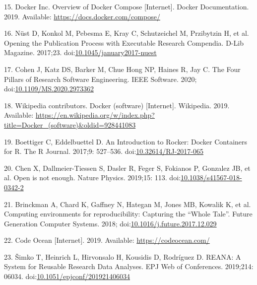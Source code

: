 \documentclass[10pt,letterpaper]{article}
\begin{document}
\leavevmode\hypertarget{ref-docker-compose_2019}{}%
15. Docker Inc. Overview of Docker Compose {[}Internet{]}. Docker
Documentation. 2019. Available: \url{https://docs.docker.com/compose/}

\leavevmode\hypertarget{ref-nust_opening_2017}{}%
16. Nüst D, Konkol M, Pebesma E, Kray C, Schutzeichel M, Przibytzin H,
et al. Opening the Publication Process with Executable Research
Compendia. D-Lib Magazine. 2017;23.
doi:\href{https://doi.org/10.1045/january2017-nuest}{10.1045/january2017-nuest}

\leavevmode\hypertarget{ref-cohen_four_2020}{}%
17. Cohen J, Katz DS, Barker M, Chue Hong NP, Haines R, Jay C. The Four
Pillars of Research Software Engineering. IEEE Software. 2020;
doi:\href{https://doi.org/10.1109/MS.2020.2973362}{10.1109/MS.2020.2973362}

\leavevmode\hypertarget{ref-wikipedia_contributors_docker_2019}{}%
18. Wikipedia contributors. Docker (software) {[}Internet{]}. Wikipedia.
2019. Available:
\url{https://en.wikipedia.org/w/index.php?title=Docker_(software)\&oldid=928441083}

\leavevmode\hypertarget{ref-boettiger_introduction_2017}{}%
19. Boettiger C, Eddelbuettel D. An Introduction to Rocker: Docker
Containers for R. The R Journal. 2017;9: 527--536.
doi:\href{https://doi.org/10.32614/RJ-2017-065}{10.32614/RJ-2017-065}

\leavevmode\hypertarget{ref-chen_open_2019}{}%
20. Chen X, Dallmeier-Tiessen S, Dasler R, Feger S, Fokianos P, Gonzalez
JB, et al. Open is not enough. Nature Physics. 2019;15: 113.
doi:\href{https://doi.org/10.1038/s41567-018-0342-2}{10.1038/s41567-018-0342-2}

\leavevmode\hypertarget{ref-brinckman_computing_2018}{}%
21. Brinckman A, Chard K, Gaffney N, Hategan M, Jones MB, Kowalik K, et
al. Computing environments for reproducibility: Capturing the ``Whole
Tale''. Future Generation Computer Systems. 2018;
doi:\href{https://doi.org/10.1016/j.future.2017.12.029}{10.1016/j.future.2017.12.029}

\leavevmode\hypertarget{ref-code_ocean_2019}{}%
22. Code Ocean {[}Internet{]}. 2019. Available:
\url{https://codeocean.com/}

\leavevmode\hypertarget{ref-simko_reana_2019}{}%
23. Šimko T, Heinrich L, Hirvonsalo H, Kousidis D, Rodríguez D. REANA: A
System for Reusable Research Data Analyses. EPJ Web of Conferences.
2019;214: 06034.
doi:\href{https://doi.org/10.1051/epjconf/201921406034}{10.1051/epjconf/201921406034}
\end{document}
